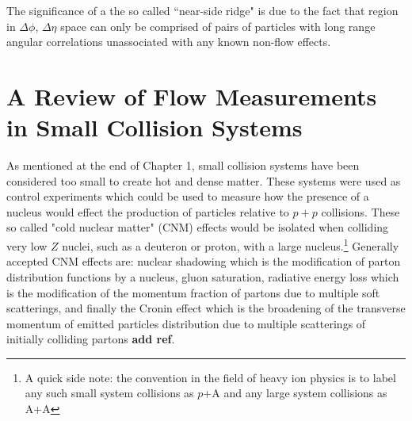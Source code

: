 
The significance of a the so called ``near-side ridge" is due to the fact that region in $\Delta\phi$, $\Delta\eta$ space can only be comprised of pairs of particles with long range angular correlations unassociated with any known non-flow effects.

\section{A Review of Flow Measurements in Small Collision Systems}

As mentioned at the end of Chapter 1, small collision systems have been considered too small to create hot and dense matter. These systems were used as control experiments which could be used to measure how the presence of a nucleus would effect the production of particles relative to $p+p$ collisions. These so called "cold nuclear matter" (CNM) effects would be isolated when colliding very low $Z$ nuclei, such as a deuteron or proton, with a large nucleus.\footnote{ A quick side note: the convention in the field of heavy ion physics is to label any such small system collisions as $p$+A and any large system collisions as A+A} Generally accepted CNM effects are: nuclear shadowing which is the modification of parton distribution functions by a nucleus, gluon saturation, radiative energy loss which is the modification of the momentum fraction of partons due to multiple soft scatterings, and finally the Cronin effect which is the broadening of the transverse momentum of emitted particles distribution due to multiple scatterings of initially colliding partons \textbf{add ref}.  

